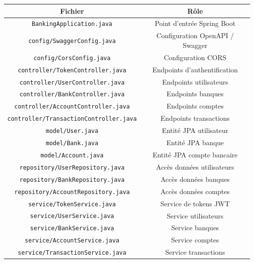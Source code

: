 \documentclass[12pt,a4paper]{article}
\newcommand{\tableheader}[1]{\textbf{#1}}
\begin{document}
\begin{table}[H]
    \centering
    \renewcommand{\arraystretch}{1.3}
    \begin{tabular}{|c|c|}
        \hline
        \tableheader{Fichier} & \tableheader{Rôle} \\
        \hline
        \texttt{BankingApplication.java} & Point d'entrée Spring Boot \\
        \hline
        \texttt{config/SwaggerConfig.java} & Configuration OpenAPI / Swagger \\
        \hline
        \texttt{config/CorsConfig.java} & Configuration CORS \\
        \hline
        \texttt{controller/TokenController.java} & Endpoints d'authentification \\
        \hline
        \texttt{controller/UserController.java} & Endpoints utilisateurs \\
        \hline
        \texttt{controller/BankController.java} & Endpoints banques \\
        \hline
        \texttt{controller/AccountController.java} & Endpoints comptes \\
        \hline
        \texttt{controller/TransactionController.java} & Endpoints transactions \\
        \hline
        \texttt{model/User.java} & Entité JPA utilisateur \\
        \hline
        \texttt{model/Bank.java} & Entité JPA banque \\
        \hline
        \texttt{model/Account.java} & Entité JPA compte bancaire \\
        \hline
        \texttt{repository/UserRepository.java} & Accès données utilisateurs \\
        \hline
        \texttt{repository/BankRepository.java} & Accès données banques \\
        \hline
        \texttt{repository/AccountRepository.java} & Accès données comptes \\
        \hline
        \texttt{service/TokenService.java} & Service de tokens JWT \\
        \hline
        \texttt{service/UserService.java} & Service utilisateurs \\
        \hline
        \texttt{service/BankService.java} & Service banques \\
        \hline
        \texttt{service/AccountService.java} & Service comptes \\
        \hline
        \texttt{service/TransactionService.java} & Service transactions \\

\end{tabular}
\end{table}
\end{document}
